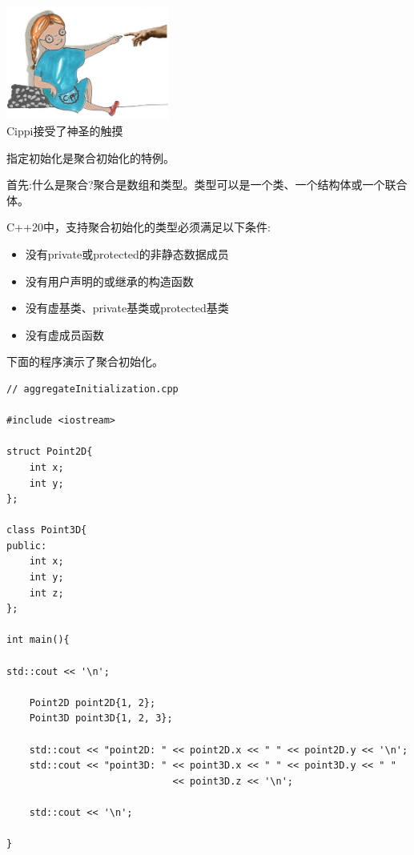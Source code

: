 
\begin{center}
\includegraphics[width=0.4\textwidth]{content/3/chapter4/images/31.png}\\
Cippi接受了神圣的触摸
\end{center}

指定初始化是聚合初始化的特例。


首先:什么是聚合?聚合是数组和类型。类型可以是一个类、一个结构体或一个联合体。

C++20中，支持聚合初始化的类型必须满足以下条件:

\begin{itemize}
\item 
没有private或protected的非静态数据成员

\item 
没有用户声明的或继承的构造函数

\item 
没有虚基类、private基类或protected基类

\item 
没有虚成员函数
\end{itemize}

下面的程序演示了聚合初始化。

\begin{lstlisting}[style=styleCXX]
// aggregateInitialization.cpp

#include <iostream>

struct Point2D{
	int x;
	int y;
};

class Point3D{
public:
	int x;
	int y;
	int z;
};

int main(){

std::cout << '\n';

	Point2D point2D{1, 2};
	Point3D point3D{1, 2, 3};
	
	std::cout << "point2D: " << point2D.x << " " << point2D.y << '\n';
	std::cout << "point3D: " << point3D.x << " " << point3D.y << " "
							 << point3D.z << '\n';
	
	std::cout << '\n';

}
\end{lstlisting}

